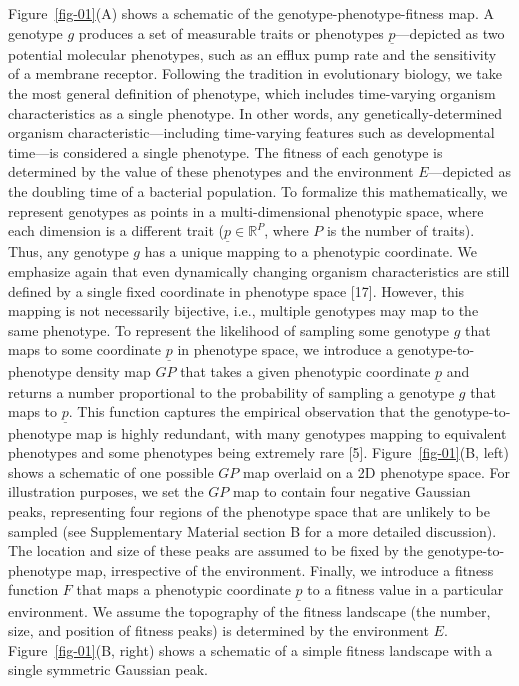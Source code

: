 \documentclass[
]{scrartcl}
\begin{document}
\begin{refsegment}
Figure~\ref{fig-01}(A) shows a schematic of the
genotype-phenotype-fitness map. A genotype \(g\) produces a set of
measurable traits or phenotypes \(\underline{p}\)---depicted as two
potential molecular phenotypes, such as an efflux pump rate and the
sensitivity of a membrane receptor.
\textcolor{tempcolor}{ Following
the tradition in evolutionary biology, we take the most general
definition of phenotype, which includes time-varying organism
characteristics as a single phenotype. In other words, any
genetically-determined organism characteristic---including time-varying
features such as developmental time---is considered a single phenotype.
} The fitness of each genotype is determined by the value of these
phenotypes and the environment \(E\)---depicted as the doubling time of
a bacterial population. To formalize this mathematically, we represent
genotypes as points in a multi-dimensional phenotypic space, where each
dimension is a different trait (\(\underline{p} \in \mathbb{R}^P\),
where \(P\) is the number of traits). Thus, any genotype \(g\) has a
unique mapping to a phenotypic coordinate.
\textcolor{tempcolor}{ We emphasize
again that even dynamically changing organism characteristics are still
defined by a single fixed coordinate in phenotype space {[}17{]}. }
However, this mapping is not necessarily bijective, i.e., multiple
genotypes may map to the same phenotype. To represent the likelihood of
sampling some genotype \(g\) that maps to some coordinate
\(\underline{p}\) in phenotype space, we introduce a
genotype-to-phenotype density map \(GP\) that takes a given phenotypic
coordinate \(\underline{p}\) and returns a number proportional to the
probability of sampling a genotype \(g\) that maps to \(\underline{p}\).
This function captures the empirical observation that the
genotype-to-phenotype map is highly redundant, with many genotypes
mapping to equivalent phenotypes and some phenotypes being extremely
rare {[}5{]}. Figure~\ref{fig-01}(B, left) shows a schematic of one
possible \(GP\) map overlaid on a 2D phenotype space. For illustration
purposes, we set the \(GP\) map to contain four negative Gaussian peaks,
representing four regions of the phenotype space that are unlikely to be
sampled (see Supplementary Material section B for a more detailed
discussion). The location and size of these peaks are assumed to be
fixed by the genotype-to-phenotype map, irrespective of the environment.
Finally, we introduce a fitness function \(F\) that maps a phenotypic
coordinate \(\underline{p}\) to a fitness value in a particular
environment. We assume the topography of the fitness landscape (the
number, size, and position of fitness peaks) is determined by the
environment \(E\). Figure~\ref{fig-01}(B, right) shows a schematic of a
simple fitness landscape with a single symmetric Gaussian peak.


\end{refsegment}
\end{document}
